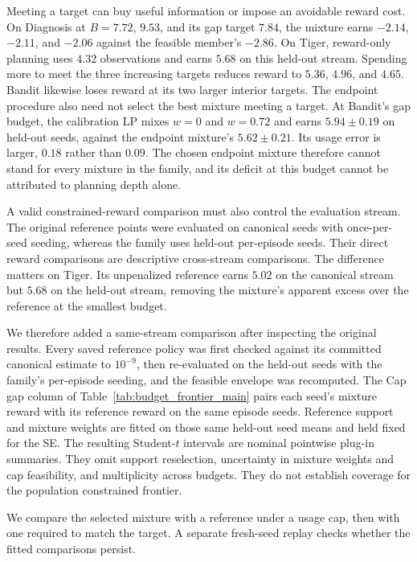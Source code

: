 \documentclass[manuscript, screen, review]{jair}
\begin{document}
Meeting a target can buy useful information or impose an avoidable reward cost. On Diagnosis at $B{=}7.72$, $9.53$, and its gap target $7.84$, the mixture earns $-2.14$, $-2.11$, and $-2.06$ against the feasible member's $-2.86$. On Tiger, reward-only planning uses $4.32$ observations and earns $5.68$ on this held-out stream. Spending more to meet the three increasing targets reduces reward to $5.36$, $4.96$, and $4.65$. Bandit likewise loses reward at its two larger interior targets. The endpoint procedure also need not select the best mixture meeting a target. At Bandit's gap budget, the calibration LP mixes $w{=}0$ and $w{=}0.72$ and earns $5.94\pm0.19$ on held-out seeds, against the endpoint mixture's $5.62\pm0.21$. Its usage error is larger, $0.18$ rather than $0.09$. The chosen endpoint mixture therefore cannot stand for every mixture in the family, and its deficit at this budget cannot be attributed to planning depth alone.

A valid constrained-reward comparison must also control the evaluation stream. The original reference points were evaluated on canonical seeds with once-per-seed seeding, whereas the family uses held-out per-episode seeds. Their direct reward comparisons are descriptive cross-stream comparisons. The difference matters on Tiger. Its unpenalized reference earns $5.02$ on the canonical stream but $5.68$ on the held-out stream, removing the mixture's apparent excess over the reference at the smallest budget.

We therefore added a same-stream comparison after inspecting the original results. Every saved reference policy was first checked against its committed canonical estimate to $10^{-9}$, then re-evaluated on the held-out seeds with the family's per-episode seeding, and the feasible envelope was recomputed. The Cap gap column of Table~\ref{tab:budget_frontier_main} pairs each seed's mixture reward with its reference reward on the same episode seeds. Reference support and mixture weights are fitted on those same held-out seed means and held fixed for the SE. The resulting Student-$t$ intervals are nominal pointwise plug-in summaries. They omit support reselection, uncertainty in mixture weights and cap feasibility, and multiplicity across budgets. They do not establish coverage for the population constrained frontier.

We compare the selected mixture with a reference under a usage cap, then with one required to match the target. A separate fresh-seed replay checks whether the fitted comparisons persist.
\end{document}
